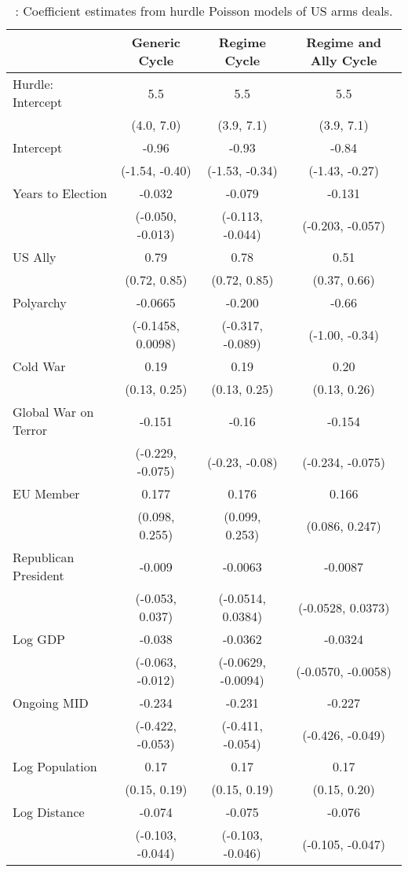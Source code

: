 
\begin{longtable}[t]{lccc}
\caption{\label{tab:pois-regs}: Coefficient estimates from hurdle Poisson models of US arms deals.}\\
\toprule
  & Generic Cycle & Regime Cycle & Regime and Ally Cycle\\
\midrule
Hurdle: Intercept & 5.5 & 5.5 & 5.5\\
 & (4.0, 7.0) & (3.9, 7.1) & (3.9, 7.1)\\
Intercept & -0.96 & -0.93 & -0.84\\
 & (-1.54, -0.40) & (-1.53, -0.34) & (-1.43, -0.27)\\
Years to Election & -0.032 & -0.079 & -0.131\\
 & (-0.050, -0.013) & (-0.113, -0.044) & (-0.203, -0.057)\\
US Ally & 0.79 & 0.78 & 0.51\\
 & (0.72, 0.85) & (0.72, 0.85) & (0.37, 0.66)\\
Polyarchy & -0.0665 & -0.200 & -0.66\\
 & (-0.1458, 0.0098) & (-0.317, -0.089) & (-1.00, -0.34)\\
Cold War & 0.19 & 0.19 & 0.20\\
 & (0.13, 0.25) & (0.13, 0.25) & (0.13, 0.26)\\
Global War on Terror & -0.151 & -0.16 & -0.154\\
 & (-0.229, -0.075) & (-0.23, -0.08) & (-0.234, -0.075)\\
EU Member & 0.177 & 0.176 & 0.166\\
 & (0.098, 0.255) & (0.099, 0.253) & (0.086, 0.247)\\
Republican President & -0.009 & -0.0063 & -0.0087\\
 & (-0.053, 0.037) & (-0.0514, 0.0384) & (-0.0528, 0.0373)\\
Log GDP & -0.038 & -0.0362 & -0.0324\\
 & (-0.063, -0.012) & (-0.0629, -0.0094) & (-0.0570, -0.0058)\\
Ongoing MID & -0.234 & -0.231 & -0.227\\
 & (-0.422, -0.053) & (-0.411, -0.054) & (-0.426, -0.049)\\
Log Population & 0.17 & 0.17 & 0.17\\
 & (0.15, 0.19) & (0.15, 0.19) & (0.15, 0.20)\\
Log Distance & -0.074 & -0.075 & -0.076\\
 & (-0.103, -0.044) & (-0.103, -0.046) & (-0.105, -0.047)\\

\end{longtable}
